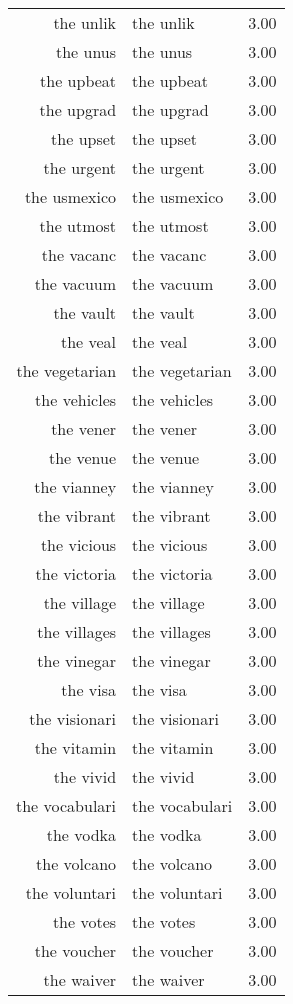 \begin{table}[ht]
\begin{tabular}{rlr}
  the unlik & the unlik & 3.00 \\ 
  the unus & the unus & 3.00 \\ 
  the upbeat & the upbeat & 3.00 \\ 
  the upgrad & the upgrad & 3.00 \\ 
  the upset & the upset & 3.00 \\ 
  the urgent & the urgent & 3.00 \\ 
  the usmexico & the usmexico & 3.00 \\ 
  the utmost & the utmost & 3.00 \\ 
  the vacanc & the vacanc & 3.00 \\ 
  the vacuum & the vacuum & 3.00 \\ 
  the vault & the vault & 3.00 \\ 
  the veal & the veal & 3.00 \\ 
  the vegetarian & the vegetarian & 3.00 \\ 
  the vehicles & the vehicles & 3.00 \\ 
  the vener & the vener & 3.00 \\ 
  the venue & the venue & 3.00 \\ 
  the vianney & the vianney & 3.00 \\ 
  the vibrant & the vibrant & 3.00 \\ 
  the vicious & the vicious & 3.00 \\ 
  the victoria & the victoria & 3.00 \\ 
  the village & the village & 3.00 \\ 
  the villages & the villages & 3.00 \\ 
  the vinegar & the vinegar & 3.00 \\ 
  the visa & the visa & 3.00 \\ 
  the visionari & the visionari & 3.00 \\ 
  the vitamin & the vitamin & 3.00 \\ 
  the vivid & the vivid & 3.00 \\ 
  the vocabulari & the vocabulari & 3.00 \\ 
  the vodka & the vodka & 3.00 \\ 
  the volcano & the volcano & 3.00 \\ 
  the voluntari & the voluntari & 3.00 \\ 
  the votes & the votes & 3.00 \\ 
  the voucher & the voucher & 3.00 \\ 
  the waiver & the waiver & 3.00 \\ 

\end{tabular}
\end{table}
